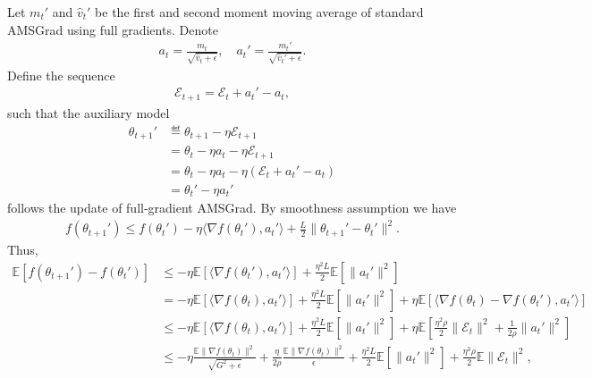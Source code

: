 \documentclass[11pt]{article}
\begin{document}
%


Let $m_t'$ and $\hat v_t'$ be the first and second moment moving average of standard AMSGrad using full gradients. Denote
\begin{align*}
    a_t=\frac{m_t}{\sqrt{\hat v_t+\epsilon}},\quad a_t'=\frac{m_t'}{\sqrt{\hat v_t'+\epsilon}}.
\end{align*}
Define the sequence
\begin{align*}
    \mathcal E_{t+1}=\mathcal E_t+a_t'-a_t,
\end{align*}
such that the auxiliary model
\begin{align*}
    \theta_{t+1}'&\eqdef\theta_{t+1}-\eta \mathcal E_{t+1}\\
    &=\theta_t-\eta a_t-\eta\mathcal E_{t+1}\\
    &=\theta_t-\eta a_t-\eta(\mathcal E_t+a_t'-a_t)\\
    &=\theta_t'-\eta a_t'
\end{align*}
follows the update of full-gradient AMSGrad. By smoothness assumption we have
\begin{align*}
    f(\theta_{t+1}')\leq f(\theta_t')-\eta\langle \nabla f(\theta_t'), a_t'\rangle+\frac{L}{2}\| \theta_{t+1}'-\theta_t'\|^2.
\end{align*}
Thus,
\begin{align*}
    \mathbb E[f(\theta_{t+1}')-f(\theta_t')]&\leq -\eta\mathbb E[\langle \nabla f(\theta_t'), a_t'\rangle]+\frac{\eta^2L}{2}\mathbb E[\|a_t'\|^2]\\
    &=-\eta\mathbb E[\langle \nabla f(\theta_t), a_t'\rangle]+\frac{\eta^2L}{2}\mathbb E[\|a_t'\|^2]+\eta\mathbb E[\langle \nabla f(\theta_t)-\nabla f(\theta_t'),a_t'\rangle] \\
    &\leq -\eta\mathbb E[\langle \nabla f(\theta_t), a_t'\rangle]+\frac{\eta^2L}{2}\mathbb E[\|a_t'\|^2]+\eta\mathbb E[\frac{\eta^2\rho}{2}\|\mathcal E_{t}\|^2+\frac{1}{2\rho}\|a_t'\|^2]\\
    &\leq -\eta\frac{\mathbb E\|\nabla f(\theta_t)\|^2}{\sqrt{G^2+\epsilon}}+\frac{\eta}{2\rho}\frac{\mathbb E\|\nabla f(\theta_t)\|^2}{\epsilon}+\frac{\eta^2L}{2}\mathbb E[\|a_t'\|^2]+\frac{\eta^3\rho}{2}\mathbb E\|\mathcal E_{t}\|^2,
\end{align*}
\end{document}
